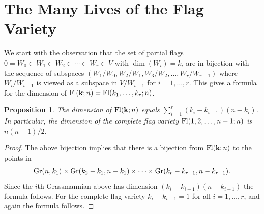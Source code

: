 \documentclass[12pt]{extarticle}
\newtheorem{proposition}[theorem]{Proposition}
\theoremstyle{definition}
\numberwithin{theorem}{section}
\begin{document}
\section{The Many Lives of the Flag Variety}\label{sec:flaglives}
We start with the observation 
that the set of partial flags $0 = W_0 \subset W_1 \subset W_2 \subset \cdots \subset W_r \subset V$ with $\dim(W_i) = k_i$ are in bijection with the 
sequence of subspaces 
$(W_1/W_0, W_2/W_1, W_3/W_2, \ldots, W_r/W_{r-1})$ where $W_i/W_{i-1}$ is viewed as a subspace in $V/W_{i-1}$ for $i=1, \ldots, r$. This gives a formula for the dimension of ${\rm Fl}({\bf k};n)={\rm Fl}(k_1, \ldots, k_r;n)$.
\begin{proposition} \label{dim-formula}
 The dimension of ${\rm Fl}({\bf k};n)$ equals $\sum_{i=1}^r (k_i - k_{i-1})(n-k_i)$. In particular, the dimension of the complete flag variety ${\rm Fl}(1, 2, \ldots,n-1; n)$ is $n(n-1)/2$.   
\end{proposition}
\begin{proof} The above bijection 
implies that there is a
bijection from ${\rm Fl}({\bf k};n)$ to the points
in 
$${\rm Gr}(n,k_1) \times {\rm Gr}(k_2-k_1, n-k_1) \times \cdots \times {\rm Gr}(k_r-k_{r-1}, n-k_{r-1}).$$
Since the $i$th Grassmannian above has dimension $(k_i-k_{i-1})(n-k_{i-1})$ the formula follows. 
For the complete flag variety $k_i - k_{i-1} = 1$ for all $i =1, \ldots, r$, and again the formula follows. 
\end{proof}
\end{document}
